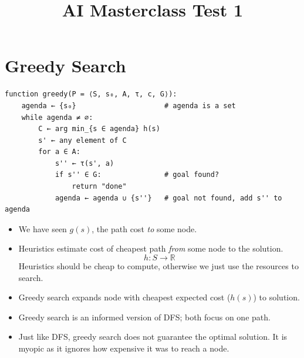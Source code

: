 \documentclass[12pt, a4paper]{article}
\title{AI Masterclass Test 1}
\author{}
\date{}
\begin{document}
\section{Greedy Search}

\begin{algorithm}[H]

\end{algorithm}
\begin{Verbatim}
function greedy(P = ⟨S, s₀, A, τ, c, G⟩):
    agenda ← {s₀}                     # agenda is a set
    while agenda ≠ ∅:
        C ← arg min_{s ∈ agenda} h(s)
        s' ← any element of C
        for a ∈ A:
            s'' ← τ(s', a)
            if s'' ∈ G:               # goal found?
                return "done"
            agenda ← agenda ∪ {s''}   # goal not found, add s'' to agenda
\end{Verbatim}

\begin{itemize}
    \item We have seen $g(s)$, the path cost \textit{to} some node.
    \item Heuristics estimate cost of cheapest path \textit{from} some node to the solution.
    \[h: S\rightarrow \mathbb{R}\]
    Heuristics should be cheap to compute, otherwise we just use the resources to search.
    \item Greedy search expands node with cheapest expected cost ($h(s)$) to solution.
    \item Greedy search is an informed version of DFS; both focus on one path.
    \item Just like DFS, greedy search does not guarantee the optimal solution. 
    It is myopic as it ignores how expensive it was to reach a node.
\end{itemize}
\end{document}
